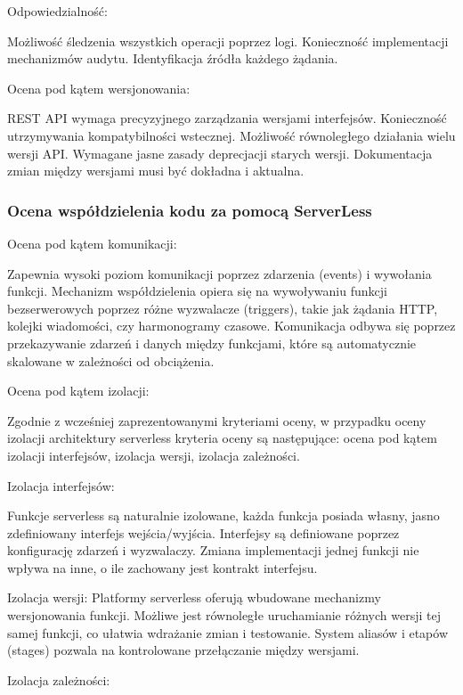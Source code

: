 \documentclass[runningheads,12pt]{llncs}
\begin{document}
Odpowiedzialność: 

Możliwość śledzenia wszystkich operacji poprzez logi. Konieczność implementacji mechanizmów audytu. Identyfikacja źródła każdego żądania. ~\cite[p. 312]{newman2015building}

Ocena pod kątem wersjonowania:

REST API wymaga precyzyjnego zarządzania wersjami interfejsów. Konieczność utrzymywania kompatybilności wstecznej. Możliwość równoległego działania wielu wersji API. Wymagane jasne zasady deprecjacji starych wersji. Dokumentacja zmian między wersjami musi być dokładna i aktualna. ~\cite[p. 134]{richardson2013rest}
\subsubsection{Ocena współdzielenia kodu za pomocą ServerLess}

Ocena pod kątem komunikacji: 

Zapewnia wysoki poziom komunikacji poprzez zdarzenia (events) i wywołania funkcji. Mechanizm współdzielenia opiera się na wywoływaniu funkcji bezserwerowych poprzez różne wyzwalacze (triggers), takie jak żądania HTTP, kolejki wiadomości, czy harmonogramy czasowe. Komunikacja odbywa się poprzez przekazywanie zdarzeń i danych między funkcjami, które są automatycznie skalowane w zależności od obciążenia. ~\cite[p. 45]{roberts2018cloud}

Ocena pod kątem izolacji:

Zgodnie z wcześniej zaprezentowanymi kryteriami oceny, w przypadku oceny izolacji architektury serverless kryteria oceny są następujące: ocena pod kątem izolacji interfejsów, izolacja wersji, izolacja zależności.

Izolacja interfejsów: 

Funkcje serverless są naturalnie izolowane, każda funkcja posiada własny, jasno zdefiniowany interfejs wejścia/wyjścia. Interfejsy są definiowane poprzez konfigurację zdarzeń i wyzwalaczy. Zmiana implementacji jednej funkcji nie wpływa na inne, o ile zachowany jest kontrakt interfejsu. ~\cite[p. 78]{roberts2018cloud}

Izolacja wersji: 
Platformy serverless oferują wbudowane mechanizmy wersjonowania funkcji. Możliwe jest równoległe uruchamianie różnych wersji tej samej funkcji, co ułatwia wdrażanie zmian i testowanie. System aliasów i etapów (stages) pozwala na kontrolowane przełączanie między wersjami. ~\cite[p. 112]{roberts2018cloud}

Izolacja zależności: 
\end{document}

